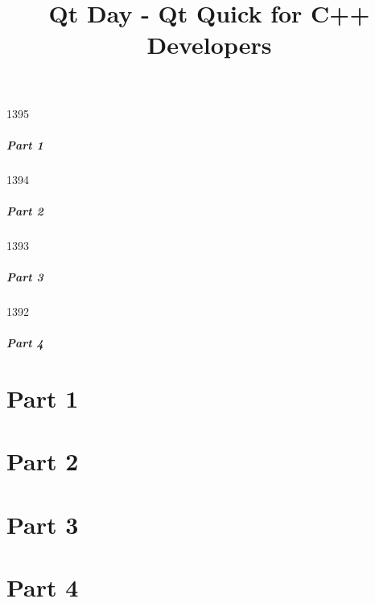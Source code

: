 \documentclass[t]{beamer}
\title{Qt Day - Qt Quick for C++ Developers}
\begin{document}


\begin{slide}{1395}
  \frametitle{Part 1}
  \tableofcontents[part=1]
\end{slide}

\begin{slide}{1394}
  \frametitle{Part 2}
  \tableofcontents[part=2]
\end{slide}

\begin{slide}{1393}
  \frametitle{Part 3}
  \tableofcontents[part=3]
\end{slide}

\begin{slide}{1392}
  \frametitle{Part 4}
  \tableofcontents[part=4]
\end{slide}

\part{Part 1}




\part{Part 2}




\part{Part 3}


\part{Part 4}



\end{document}
